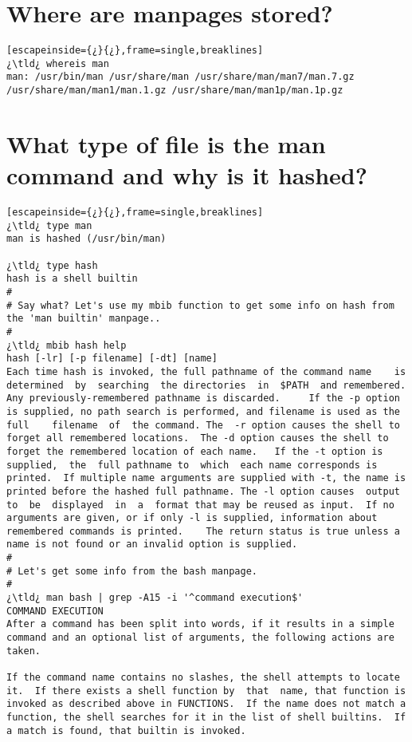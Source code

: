 \section{Where are manpages stored?}

\begin{lstlisting}[escapeinside={¿}{¿},frame=single,breaklines]
¿\tld¿ whereis man
man: /usr/bin/man /usr/share/man /usr/share/man/man7/man.7.gz /usr/share/man/man1/man.1.gz /usr/share/man/man1p/man.1p.gz
\end{lstlisting}

\section{What type of file is the man command and why is it hashed?}

\begin{lstlisting}[escapeinside={¿}{¿},frame=single,breaklines]
¿\tld¿ type man
man is hashed (/usr/bin/man)

¿\tld¿ type hash
hash is a shell builtin
#
# Say what? Let's use my mbib function to get some info on hash from the 'man builtin' manpage..
#
¿\tld¿ mbib hash help
hash [-lr] [-p filename] [-dt] [name]
Each time hash is invoked, the full pathname of the command name	is  determined	by  searching  the directories  in  $PATH  and remembered.  Any previously-remembered pathname is discarded.	 If the -p option is supplied, no path search is performed, and filename is used as the full	filename  of  the command. The  -r option causes the shell to forget all remembered locations.  The -d option causes the shell to forget the remembered location of each name.	 If the -t option is  supplied,	 the  full pathname	to  which  each name corresponds is printed.  If multiple name arguments are supplied with -t, the name is printed before the hashed full pathname.	The -l option causes  output  to  be  displayed  in  a  format that may be reused as input.  If no arguments are given, or if only -l is supplied, information about remembered commands is printed.	The return status is true unless a name is not found or an invalid option is supplied.
#
# Let's get some info from the bash manpage.
#
¿\tld¿ man bash | grep -A15 -i '^command execution$'
COMMAND EXECUTION
After a command has been split into words, if it results in a simple command and an optional list of arguments, the following actions are taken.

If the command name contains no slashes, the shell attempts to locate it.  If there exists a shell function by  that  name, that function is invoked as described above in FUNCTIONS.  If the name does not match a function, the shell searches for it in the list of shell builtins.  If a match is found, that builtin is invoked.


\end{lstlisting}

